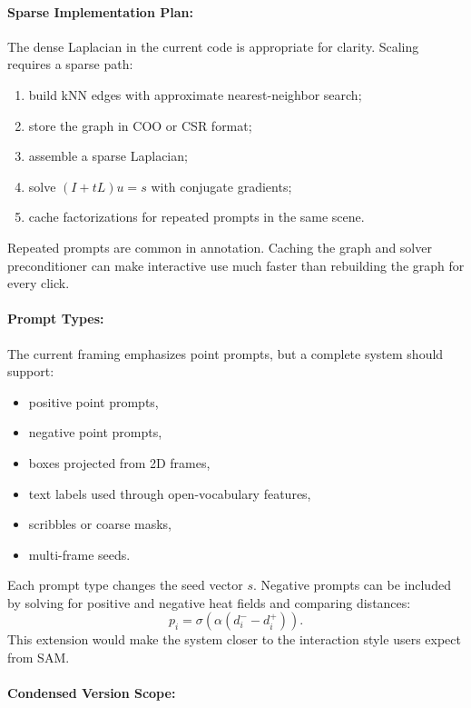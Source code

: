 \documentclass{article}
\begin{document}
\paragraph{Sparse Implementation Plan:}

The dense Laplacian in the current code is appropriate for clarity. Scaling requires a sparse path:
\begin{enumerate}
  \item build kNN edges with approximate nearest-neighbor search;
  \item store the graph in COO or CSR format;
  \item assemble a sparse Laplacian;
  \item solve $(I+tL)u=s$ with conjugate gradients;
  \item cache factorizations for repeated prompts in the same scene.
\end{enumerate}
Repeated prompts are common in annotation. Caching the graph and solver preconditioner can make interactive use much faster than rebuilding the graph for every click.

\paragraph{Prompt Types:}

The current framing emphasizes point prompts, but a complete system should support:
\begin{itemize}
  \item positive point prompts,
  \item negative point prompts,
  \item boxes projected from 2D frames,
  \item text labels used through open-vocabulary features,
  \item scribbles or coarse masks,
  \item multi-frame seeds.
\end{itemize}
Each prompt type changes the seed vector $s$. Negative prompts can be included by solving for positive and negative heat fields and comparing distances:
\begin{equation}
  p_i=\sigma(\alpha(d_i^{-}-d_i^{+})).
\end{equation}
This extension would make the system closer to the interaction style users expect from SAM.

\paragraph{Condensed Version Scope:}
\end{document}
